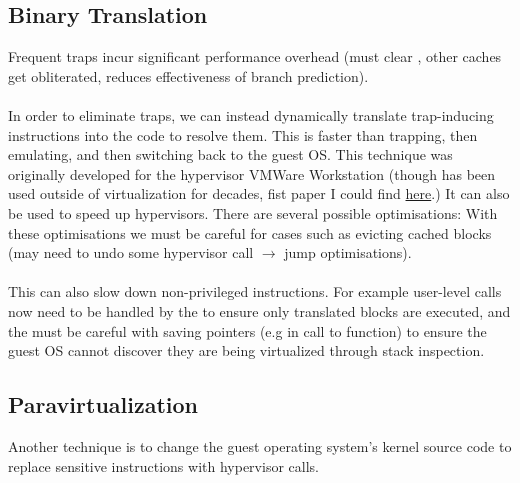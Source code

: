 \documentclass{report}
\begin{document}
\subsection*{Binary Translation}
Frequent traps incur significant performance overhead (must clear , other caches get obliterated, reduces effectiveness of branch prediction).
\\
\\ In order to eliminate traps, we can instead dynamically translate trap-inducing instructions into the code to resolve them. This is faster than trapping, then emulating, and then switching back to the guest OS.
This technique was originally developed for the  hypervisor VMWare Workstation (though has been used outside of virtualization for decades, fist paper I could find \href{https://dl.acm.org/doi/10.1145/151220.151227}{here}.) It can also be used to speed up  hypervisors.
There are several possible optimisations:
With these optimisations we must be careful for cases such as evicting cached blocks (may need to undo some hypervisor call $\to$ jump optimisations).
\\
\\ This can also slow down non-privileged instructions. For example user-level calls now need to be handled by the  to ensure only translated blocks are executed, and the  must be careful with saving pointers (e.g in call to  function) to ensure the guest OS cannot discover they are being virtualized through stack inspection.
\subsection*{Paravirtualization}
Another technique is to change the guest operating system's kernel source code to replace sensitive instructions with hypervisor calls.
\end{document}
